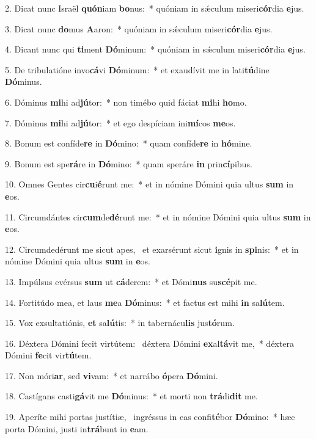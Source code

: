 2. Dicat nunc Israël \textbf{quón}iam \textbf{bo}nus:~*  quóniam in sǽculum miseri\textbf{cór}dia \textbf{e}jus.\

3. Dicat nunc \textbf{do}mus \textbf{A}aron:~*  quóniam in sǽculum miseri\textbf{cór}dia \textbf{e}jus.\

4. Dicant nunc qui \textbf{ti}ment \textbf{Dó}minum:~*  quóniam in sǽculum miseri\textbf{cór}dia \textbf{e}jus.\

5. De tribulatióne invo\textbf{cá}vi \textbf{Dó}minum:~*  et exaudívit me in lati\textbf{tú}dine \textbf{Dó}minus.\

6. Dóminus \textbf{mi}hi ad\textbf{jú}tor:~*  non timébo quid fáciat \textbf{mi}hi \textbf{ho}mo.\

7. Dóminus \textbf{mi}hi ad\textbf{jú}tor:~*  et ego despíciam ini\textbf{mí}cos \textbf{me}os.\

8. Bonum est confíde\textbf{re} in \textbf{Dó}mino:~*  quam confíde\textbf{re} in \textbf{hó}mine.\

9. Bonum est spe\textbf{rá}re in \textbf{Dó}mino:~*  quam speráre \textbf{in} prin\textbf{cí}pibus.\

10. Omnes Gentes cir\textbf{cu}i\textbf{é}runt me:~*  et in nómine Dómini quia ultus \textbf{sum} in \textbf{e}os.\

11. Circumdántes cir\textbf{cum}de\textbf{dé}runt me:~*  et in nómine Dómini quia ultus \textbf{sum} in \textbf{e}os.\

12. Circumdedérunt me sicut apes, \dag\  et exarsérunt sicut \textbf{i}gnis in \textbf{spi}nis:~*  et in nómine Dómini quia ultus \textbf{sum} in \textbf{e}os.\

13. Impúlsus evérsus \textbf{sum} ut \textbf{cá}derem:~*  et Dómi\textbf{nus} su\textbf{scé}pit me.\

14. Fortitúdo mea, et laus \textbf{me}a \textbf{Dó}minus:~*  et factus est mihi \textbf{in} sa\textbf{lú}tem.\

15. Vox exsultatiónis, \textbf{et} sa\textbf{lú}tis:~*  in tabernácu\textbf{lis} jus\textbf{tó}rum.\

16. Déxtera Dómini fecit virtútem: \dag\  déxtera Dómini \textbf{ex}al\textbf{tá}vit me,~*  déxtera Dómini \textbf{fe}cit vir\textbf{tú}tem.\

17. Non móri\textbf{ar}, sed \textbf{vi}vam:~*  et narrábo \textbf{ó}pera \textbf{Dó}mini.\

18. Castígans casti\textbf{gá}vit me \textbf{Dó}minus:~*  et morti non \textbf{trá}di\textbf{dit} me.\

19. Aperíte mihi portas justítiæ, \dag\  ingréssus in eas confi\textbf{té}bor \textbf{Dó}mino:~*  hæc porta Dómini, justi in\textbf{trá}bunt in \textbf{e}am.\


